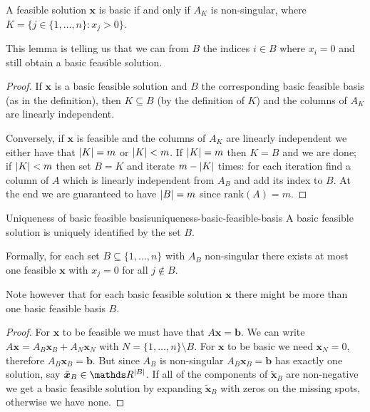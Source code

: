 \documentclass[12pt]{extarticle}
\renewcommand{\vec}[1]{\bm{#1}}
\begin{document}
\begin{lemma}{}{}
	A feasible solution $\vec x$ is basic if and only if $A_K$ is non-singular, where
	$K = \{ j \in \{1, \dots, n\} : x_j > 0 \}$.
\end{lemma}

This lemma is telling us that we can  from $B$ the indices $i \in B$ where $x_i = 0$
and still obtain a basic feasible solution.

\begin{proof}
	If $\vec x$ is a basic feasible solution and $B$ the corresponding basic feasible basis (as in the
	definition), then $K \subseteq B$ (by the definition of $K$) and the columns of $A_K$ are linearly
	independent.

	Conversely, if $\vec x$ is feasible and the columns of $A_K$ are linearly independent we either
	have that $\abs{K} = m$ or $\abs{K} < m$.
	If $\abs{K} = m$ then $K = B$ and we are done; if $\abs{K} < m$ then set $B = K$ and
	iterate $m- \abs{K}$ times: for each iteration find a column of $A$ which is linearly independent
	from $A_B$ and add its index to $B$.
	At the end we are guaranteed to have $\abs{B} = m$ since $\mathrm{rank}(A) = m$.
\end{proof}

\begin{proposition}{Uniqueness of basic feasible basis}{uniqueness-basic-feasible-basis}
	A basic feasible solution is uniquely identified by the set $B$.

	Formally, for each set $B \subseteq \{1, \dots, n\}$ with $A_B$ non-singular
	there exists at most one feasible $\vec x$ with $x_j = 0$ for all $j \notin B$.
\end{proposition}

Note however that for each basic feasible solution $\vec x$ there might be more than one basic
feasible basis $B$.

\begin{proof}
	For $\vec x$ to be feasible we must have that $A \vec x = \vec b$.
	We can write $A \vec x = A_B \vec x_B + A_N \vec x_N$ with $N = \{1, \dots, n\} \setminus B$.
	For $\vec x$ to be basic we need $\vec x_N = 0$, therefore $A_B \vec x_B = \vec b$.
	But since $A_B$ is non-singular $A_B \vec x_B = \vec b$ has exactly one solution, say
	$\tilde{\vec x}_B \in \R^{\abs{B}}$.
	If all of the components of $\tilde{\vec x}_B$ are non-negative we get a basic feasible solution by
	expanding $\tilde{\vec x}_B$ with zeros on the missing spots, otherwise we have none.
\end{proof}
\end{document}
